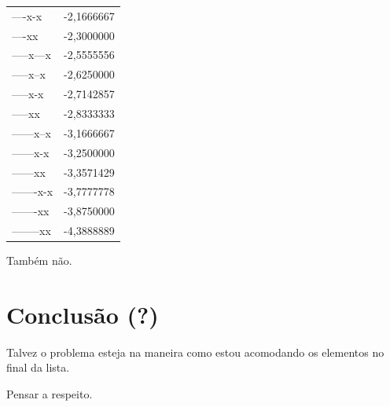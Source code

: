 \documentclass[
  letterpaper,
  DIV=11,
  numbers=noendperiod]{scrreprt}
\begin{document}
\begin{longtable*}{lr}
----x-x & -2,1666667 \\ 
----xx & -2,3000000 \\ 
-----x---x & -2,5555556 \\ 
-----x--x & -2,6250000 \\ 
-----x-x & -2,7142857 \\ 
-----xx & -2,8333333 \\ 
------x--x & -3,1666667 \\ 
------x-x & -3,2500000 \\ 
------xx & -3,3571429 \\ 
-------x-x & -3,7777778 \\ 
-------xx & -3,8750000 \\ 
--------xx & -4,3888889 \\ 
\bottomrule
\end{longtable*}

Também não.

\section{Conclusão (?)}\label{conclusuxe3o}

Talvez o problema esteja na maneira como estou acomodando os elementos
no final da lista.

Pensar a respeito.
\end{document}

